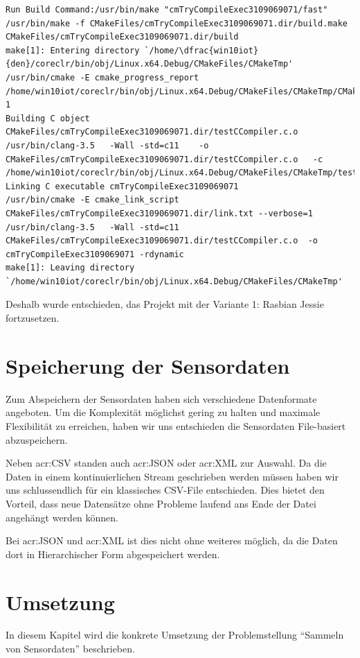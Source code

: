 \begin{lstlisting}
Run Build Command:/usr/bin/make "cmTryCompileExec3109069071/fast"
/usr/bin/make -f CMakeFiles/cmTryCompileExec3109069071.dir/build.make CMakeFiles/cmTryCompileExec3109069071.dir/build
make[1]: Entering directory `/home/\dfrac{win10iot}{den}/coreclr/bin/obj/Linux.x64.Debug/CMakeFiles/CMakeTmp'
/usr/bin/cmake -E cmake_progress_report /home/win10iot/coreclr/bin/obj/Linux.x64.Debug/CMakeFiles/CMakeTmp/CMakeFiles 1
Building C object CMakeFiles/cmTryCompileExec3109069071.dir/testCCompiler.c.o
/usr/bin/clang-3.5   -Wall -std=c11    -o CMakeFiles/cmTryCompileExec3109069071.dir/testCCompiler.c.o   -c /home/win10iot/coreclr/bin/obj/Linux.x64.Debug/CMakeFiles/CMakeTmp/testCCompiler.c
Linking C executable cmTryCompileExec3109069071
/usr/bin/cmake -E cmake_link_script CMakeFiles/cmTryCompileExec3109069071.dir/link.txt --verbose=1
/usr/bin/clang-3.5   -Wall -std=c11     CMakeFiles/cmTryCompileExec3109069071.dir/testCCompiler.c.o  -o cmTryCompileExec3109069071 -rdynamic 
make[1]: Leaving directory `/home/win10iot/coreclr/bin/obj/Linux.x64.Debug/CMakeFiles/CMakeTmp'
\end{lstlisting}

Deshalb wurde entschieden, das Projekt mit der Variante 1: Rasbian Jessie fortzusetzen.

\section{Speicherung der Sensordaten}
Zum Abspeichern der Sensordaten haben sich verschiedene Datenformate angeboten. Um die Komplexität möglichst gering zu halten und maximale Flexibilität zu erreichen, haben wir uns entschieden die Sensordaten File-basiert abzuspeichern.

Neben \gls{acr:CSV} standen auch \gls{acr:JSON} oder \gls{acr:XML} zur Auswahl. Da die Daten in einem kontinuierlichen Stream geschrieben werden müssen haben wir uns schlussendlich für ein klassisches CSV-File entschieden. Dies bietet den Vorteil, dass neue Datensätze ohne Probleme laufend ans Ende der Datei angehängt werden können.

Bei \gls{acr:JSON} und \gls{acr:XML} ist dies nicht ohne weiteres möglich, da die Daten dort in Hierarchischer Form abgespeichert werden.


\section{Umsetzung}
In diesem Kapitel wird die konkrete Umsetzung der Problemstellung "`Sammeln von Sensordaten"' beschrieben.


